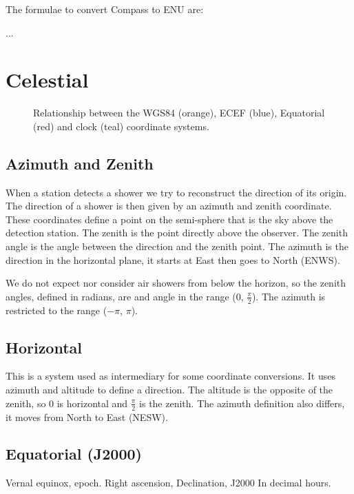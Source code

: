 The formulae to convert Compass to ENU are:

...


\section{Celestial}


\begin{figure}
    \centering
    
    \caption{Relationship between the WGS84 (orange), ECEF (blue),
             Equatorial (red) and clock (teal) coordinate systems.}
    \label{fig:wgs84_equatorial}
\end{figure}


\subsection{Azimuth and Zenith}

When a station detects a shower we try to reconstruct the direction of
its origin. The direction of a shower is then given by an azimuth and
zenith coordinate. These coordinates define a point on the semi-sphere
that is the sky above the detection station. The zenith is the point
directly above the observer. The zenith angle is the angle between the
direction and the zenith point. The azimuth is the direction in the
horizontal plane, it starts at East then goes to North (ENWS).

We do not expect nor consider air showers from below the horizon, so the
zenith angles, defined in radians, are and angle in the range (0,
$\frac{\pi}{2}$). The azimuth is restricted to the range ($-\pi$, $\pi$).


\subsection{Horizontal}

This is a system used as intermediary for some coordinate conversions.
It uses azimuth and altitude to define a direction. The altitude is the
opposite of the zenith, so 0 is horizontal and $\frac{\pi}{2}$ is the
zenith. The azimuth definition also differs, it moves from North to East
(NESW).


\subsection{Equatorial (J2000)}

Vernal equinox, epoch.
Right ascension, Declination, J2000
In decimal hours.


